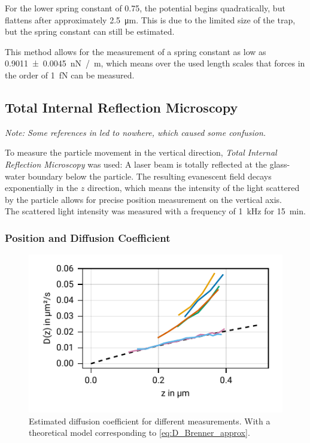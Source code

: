 \documentclass[
    twoside=false,
    twocolumn=true,
    fontsize=11pt,
]{scrarticle}
\begin{document}
For the lower spring constant of \SI{0.75}{}, the potential begins quadratically, but flattens after approximately \SI{2.5}{\micro m}.
This is due to the limited size of the trap, but the spring constant can still be estimated.

This method allows for the measurement of a spring constant as low as \SI{0.9011(45)}{\nano N /m}, which means over the used length scales that forces in the order of \SI{1}{\femto N} can be measured.

\subsection{Total Internal Reflection Microscopy}
\emph{Note: Some references in \cite{instructions} led to nowhere, which caused some confusion.}

To measure the particle movement in the vertical direction, \textit{Total Internal Reflection Microscopy} was used: A laser beam is totally reflected at the glass-water boundary below the particle. The resulting evanescent field decays exponentially in the $z$ direction, which means the intensity of the light scattered by the particle allows for precise position measurement on the vertical axis.\\
The scattered light intensity was measured with a frequency of \SI{1}{kHz} for \SI{15}{min}.


\subsubsection*{Position and Diffusion Coefficient}
\begin{figure}
    \centering
    \includegraphics{figures/02_04_01_diffusion.pdf}
    \caption{Estimated diffusion coefficient for different measurements. With a theoretical model corresponding to \autoref{eq:D_Brenner_approx}.}
    \label{fig:D_of_z}
\end{figure}
\end{document}
